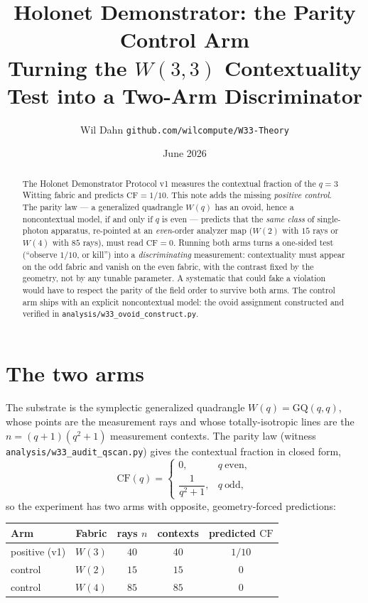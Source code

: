 \documentclass[11pt]{article}
\title{\textbf{Holonet Demonstrator: the Parity Control Arm}\\[0.3em]
\large Turning the $W(3,3)$ Contextuality Test into a Two-Arm Discriminator}
\author{Wil Dahn \quad\textbar\quad \texttt{github.com/wilcompute/W33-Theory}}
\date{June 2026}
\begin{document}
\maketitle

\begin{abstract}
The Holonet Demonstrator Protocol v1 measures the contextual fraction of the $q=3$ Witting fabric and
predicts $\mathrm{CF}=1/10$.  This note adds the missing \emph{positive control}.  The parity law --- a
generalized quadrangle $W(q)$ has an ovoid, hence a noncontextual model, if and only if $q$ is even ---
predicts that the \emph{same class} of single-photon apparatus, re-pointed at an \emph{even}-order
analyzer map ($W(2)$ with $15$ rays or $W(4)$ with $85$ rays), must read $\mathrm{CF}=0$.  Running both
arms turns a one-sided test (``observe $1/10$, or kill'') into a \emph{discriminating} measurement:
contextuality must appear on the odd fabric and vanish on the even fabric, with the contrast fixed by
the geometry, not by any tunable parameter.  A systematic that could fake a violation would have to
respect the parity of the field order to survive both arms.  The control arm ships with an explicit
noncontextual model: the ovoid assignment constructed and verified in
\texttt{analysis/w33\_ovoid\_construct.py}.
\end{abstract}

\section{The two arms}
The substrate is the symplectic generalized quadrangle $W(q)=\mathrm{GQ}(q,q)$, whose points are the
measurement rays and whose totally-isotropic lines are the $n=(q+1)(q^2+1)$ measurement contexts.  The
parity law (witness \texttt{analysis/w33\_audit\_qscan.py}) gives the contextual fraction in closed
form,
\[
  \mathrm{CF}(q)=
  \begin{cases}
    0, & q\ \text{even},\\[2pt]
    \dfrac{1}{q^2+1}, & q\ \text{odd},
  \end{cases}
\]
so the experiment has two arms with opposite, geometry-forced predictions:

\begin{center}
\begin{tabular}{lcccc}
\toprule
Arm & Fabric & rays $n$ & contexts & predicted $\mathrm{CF}$\\
\midrule
positive (v1) & $W(3)$ & $40$ & $40$ & $1/10$\\
control       & $W(2)$ & $15$ & $15$ & $0$\\
control       & $W(4)$ & $85$ & $85$ & $0$\\
\bottomrule
\end{tabular}
\end{center}
\end{document}
